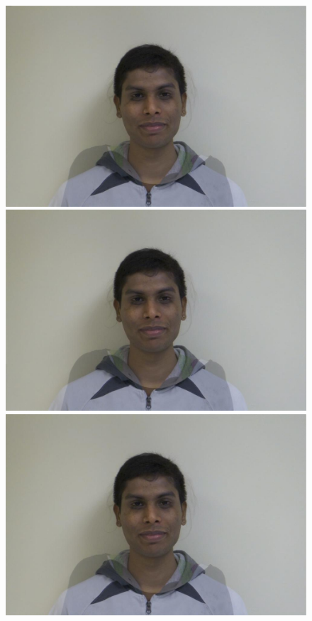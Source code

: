 \documentclass[11pt]{article}
\begin{document}
\begin{figure}[H]
\begin{center}
\includegraphics[scale=0.06]{figs/frames/morph_steinkirch_tangatur_43.jpg}  
\includegraphics[scale=0.06]{figs/frames/morph_steinkirch_tangatur_44.jpg} 
\includegraphics[scale=0.06]{figs/frames/morph_steinkirch_tangatur_45.jpg} 

\end{center}
\end{figure}
\end{document}
